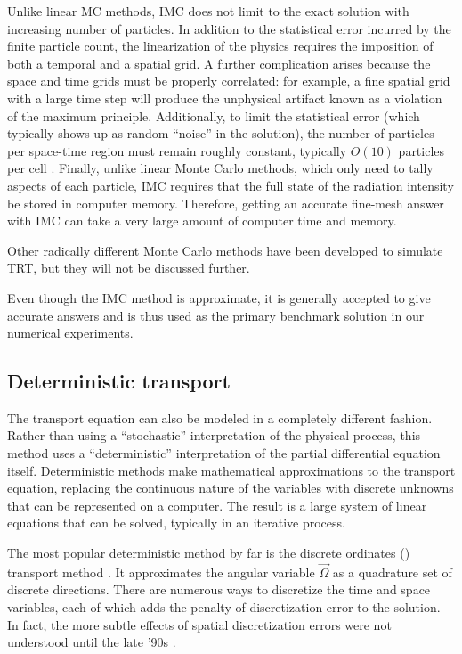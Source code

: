 Unlike linear MC methods, IMC does not limit to the exact solution with
increasing number of particles. In addition to the statistical error incurred
by the finite particle count, the linearization of the physics requires
the imposition of both a temporal and a spatial grid. A further complication 
arises because the space and time grids must be properly correlated: for
example, a fine spatial grid with a large time step will produce the unphysical
artifact known as a violation of the maximum principle.
Additionally, to limit the statistical error (which typically shows up as
random ``noise'' in the solution), the number of particles per
space-time region must remain roughly constant, typically $O(10)$ particles per
cell \cite{McC2008}. Finally, unlike linear Monte
Carlo methods, which only need to tally aspects of each particle, IMC requires
that the full state of the radiation intensity be stored in computer memory.
Therefore, getting an accurate fine-mesh answer with IMC can take a very large
amount of computer time and memory.

Other radically different Monte Carlo methods \cite{Bro1989,NKa1991,Cha2007a,
Den2004}
have been developed to simulate TRT, but they will not be discussed further.

Even though the IMC method is approximate, it is generally accepted to give
accurate answers and is thus used as the primary benchmark solution in
our numerical experiments. 

\subsection{Deterministic transport}
The transport equation can also be modeled in a completely different fashion.
Rather than using a ``stochastic'' interpretation of the physical process,
this method
uses a ``deterministic'' interpretation of the partial differential equation
itself. Deterministic methods make mathematical approximations to the transport
equation, replacing the continuous nature of the variables with discrete
unknowns that can be represented on a computer. The result is a large system of
linear equations that can be solved, typically in an iterative process.

The most popular deterministic method by far is the discrete ordinates (\SN)
transport method \cite{Lar2010}. It approximates the angular variable
$\vec{\Omega}$ as a quadrature set of discrete directions. There are numerous
ways to discretize the time and space variables, each of which adds the penalty
of discretization error to the solution. In fact, the more subtle effects of
spatial discretization errors were not understood until the late '90s
\cite{Ada1998,Ada2001}.

